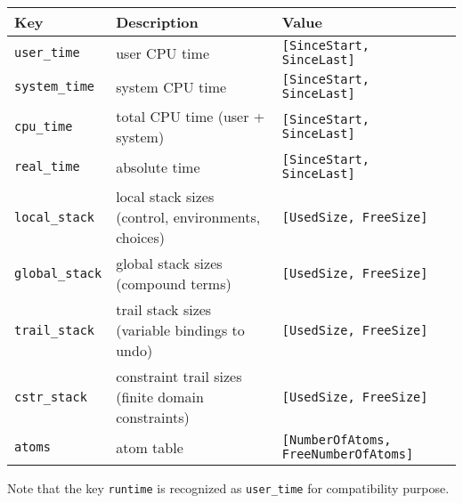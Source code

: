 \begin{tabular}{|l|l|l|}
\hline

Key & Description & Value \\

\hline\hline

\texttt{user\_time} & user CPU time & \texttt{[SinceStart, SinceLast]} \\

\hline

\texttt{system\_time} & system CPU time & \texttt{[SinceStart, SinceLast]}
\\

\hline

\texttt{cpu\_time} & total CPU time (user + system) & \texttt{[SinceStart,
SinceLast]} \\

\hline

\texttt{real\_time} & absolute time & \texttt{[SinceStart, SinceLast]} \\

\hline

\texttt{local\_stack} & local stack sizes (control, environments, choices) & \texttt{[UsedSize, FreeSize]} \\

\hline

\texttt{global\_stack} & global stack sizes (compound terms) &
\texttt{[UsedSize, FreeSize]} \\

\hline

\texttt{trail\_stack} & trail stack sizes (variable bindings to undo) &
\texttt{[UsedSize, FreeSize]} \\

\hline

\texttt{cstr\_stack} & constraint trail sizes (finite domain constraints) &
\texttt{[UsedSize, FreeSize]} \\

\hline

\texttt{atoms} & atom table &
\texttt{[NumberOfAtoms, FreeNumberOfAtoms]} \\

\hline
\end{tabular}

Note that the key \texttt{runtime} is recognized as \texttt{user\_time} for
compatibility purpose.


\begin{PlErrors}




\end{PlErrors}

